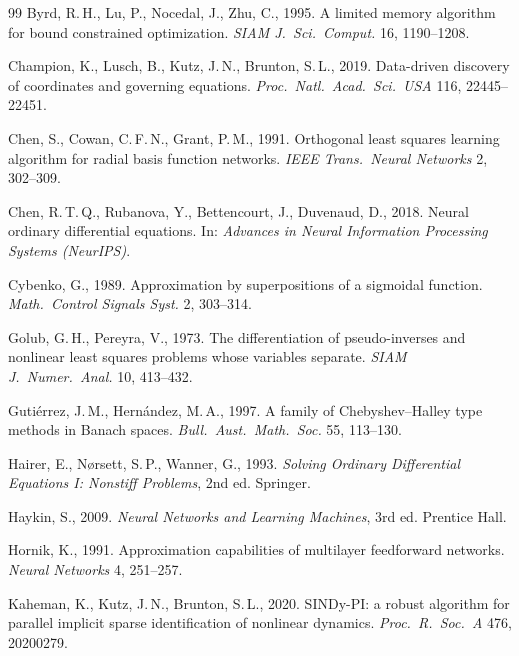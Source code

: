 \documentclass[preprint,12pt,numbers]{elsarticle}
\begin{document}
\begin{thebibliography}{99}
Byrd, R.\,H., Lu, P., Nocedal, J., Zhu, C., 1995. A limited memory algorithm
for bound constrained optimization. \emph{SIAM J.\ Sci.\ Comput.} 16,
1190--1208.

Champion, K., Lusch, B., Kutz, J.\,N., Brunton, S.\,L., 2019.
Data-driven discovery of coordinates and governing equations. \emph{Proc.\
Natl.\ Acad.\ Sci.\ USA} 116, 22445--22451.

Chen, S., Cowan, C.\,F.\,N., Grant, P.\,M., 1991. Orthogonal least
squares learning algorithm for radial basis function networks.
\emph{IEEE Trans.\ Neural Networks} 2, 302--309.

Chen, R.\,T.\,Q., Rubanova, Y., Bettencourt, J., Duvenaud, D., 2018.
Neural ordinary differential equations. In: \emph{Advances in Neural
Information Processing Systems (NeurIPS)}.

Cybenko, G., 1989. Approximation by superpositions of a sigmoidal
function. \emph{Math.\ Control Signals Syst.} 2, 303--314.

Golub, G.\,H., Pereyra, V., 1973. The differentiation of pseudo-inverses
and nonlinear least squares problems whose variables separate.
\emph{SIAM J.\ Numer.\ Anal.} 10, 413--432.

Guti\'errez, J.\,M., Hern\'andez, M.\,A., 1997. A family of
Chebyshev--Halley type methods in Banach spaces. \emph{Bull.\ Aust.\
Math.\ Soc.} 55, 113--130.

Hairer, E., N\o rsett, S.\,P., Wanner, G., 1993. \emph{Solving Ordinary
Differential Equations I: Nonstiff Problems}, 2nd ed. Springer.

\bibitem[Haykin(2009)]{Haykin2009}
Haykin, S., 2009. \emph{Neural Networks and Learning Machines}, 3rd ed.
Prentice Hall.

Hornik, K., 1991. Approximation capabilities of multilayer feedforward
networks. \emph{Neural Networks} 4, 251--257.

Kaheman, K., Kutz, J.\,N., Brunton, S.\,L., 2020. SINDy-PI: a robust
algorithm for parallel implicit sparse identification of nonlinear
dynamics. \emph{Proc.\ R.\ Soc.\ A} 476, 20200279.


\end{thebibliography}
\end{document}
